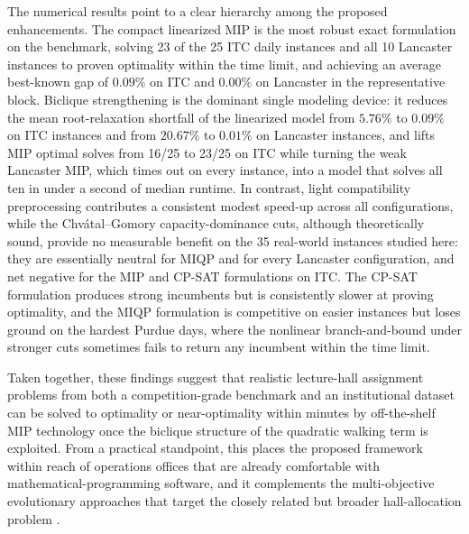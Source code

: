 \documentclass[11pt]{article}
\begin{document}
The numerical results point to a clear hierarchy among the proposed enhancements. The compact linearized MIP is the most robust exact formulation on the benchmark, solving 23 of the 25 ITC daily instances and all 10 Lancaster instances to proven optimality within the time limit, and achieving an average best-known gap of $0.09\%$ on ITC and $0.00\%$ on Lancaster in the representative block. Biclique strengthening is the dominant single modeling device: it reduces the mean root-relaxation shortfall of the linearized model from $5.76\%$ to $0.09\%$ on ITC instances and from $20.67\%$ to $0.01\%$ on Lancaster instances, and lifts MIP optimal solves from 16/25 to 23/25 on ITC while turning the weak Lancaster MIP, which times out on every instance, into a model that solves all ten in under a second of median runtime. In contrast, light compatibility preprocessing contributes a consistent modest speed-up across all configurations, while the Chv\'atal--Gomory capacity-dominance cuts, although theoretically sound, provide no measurable benefit on the 35 real-world instances studied here: they are essentially neutral for MIQP and for every Lancaster configuration, and net negative for the MIP and CP-SAT formulations on ITC. The CP-SAT formulation produces strong incumbents but is consistently slower at proving optimality, and the MIQP formulation is competitive on easier instances but loses ground on the hardest Purdue days, where the nonlinear branch-and-bound under stronger cuts sometimes fails to return any incumbent within the time limit.

Taken together, these findings suggest that realistic lecture-hall assignment problems from both a competition-grade benchmark and an institutional dataset can be solved to optimality or near-optimality within minutes by off-the-shelf MIP technology once the biclique structure of the quadratic walking term is exploited. From a practical standpoint, this places the proposed framework within reach of operations offices that are already comfortable with mathematical-programming software, and it complements the multi-objective evolutionary approaches that target the closely related but broader hall-allocation problem \citep{roomalloc2026}.
\end{document}
